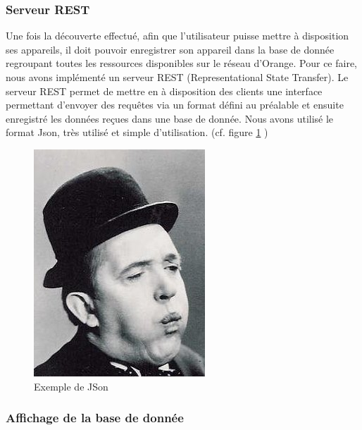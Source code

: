 \documentclass[twocolumn,a4paper]{IEEEtranfr}
\begin{document}
\subsubsection{Serveur REST}

Une fois la découverte effectué, afin que l’utilisateur puisse mettre à disposition ses appareils, il doit pouvoir enregistrer son appareil dans la base de donnée regroupant toutes les ressources disponibles sur le réseau d’Orange. Pour ce faire, nous avons implémenté un serveur REST (Representational State Transfer). Le serveur REST permet de mettre en à disposition des clients une interface permettant d’envoyer des requêtes via un format défini au préalable et ensuite enregistré les données reçues dans une base de donnée. Nous avons utilisé le format Json, très utilisé et simple d’utilisation.  (cf. figure \ref{fig:json} )

\begin{figure}[htpb]
  \begin{center}
    \includegraphics[width=0.7\columnwidth] {../images/SLaurel.jpg}
  \end{center}
  \caption{Exemple de JSon }
  \label{fig:json}
\end{figure}

\subsubsection{Affichage de la base de donnée}
\end{document}
